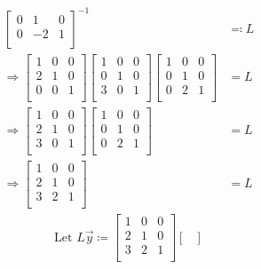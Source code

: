 \documentclass{article}
\begin{document}
\begin{align*}
\begin{bmatrix}
         0&1  &0   \\
         0&-2  &1   \\
    \end{bmatrix}^{-1} &\eqqcolon  L\\
    \Longrightarrow \begin{bmatrix}
        1 &0  &0   \\
         2&1  &0   \\
         0&0  &1   \\
    \end{bmatrix}\begin{bmatrix}
        1 &0  &0   \\
         0&1  &0   \\
         3&0  &1   \\
    \end{bmatrix}\begin{bmatrix}
        1 &0  &0   \\
         0&1  &0   \\
         0&2  &1   \\
    \end{bmatrix}&=L\\
    \Longrightarrow \begin{bmatrix}
        1 &0  &0   \\
         2&1  &0   \\
         3&0  &1   \\
    \end{bmatrix}\begin{bmatrix}
        1 &0  &0   \\
         0&1  &0   \\
         0&2  &1   \\
    \end{bmatrix}&=L\\
    \Longrightarrow \begin{bmatrix}
        1 &0  &0   \\
         2&1  &0   \\
         3&2  &1   \\
    \end{bmatrix}&=L
\end{align*}\begin{align*}
    \text{Let }L\vec{y}\coloneqq \begin{bmatrix}
        1 &0  &0   \\
         2&1  &0   \\
         3&2  &1   \\
    \end{bmatrix} \begin{bmatrix}

\end{bmatrix}
\end{align*}
\end{document}
